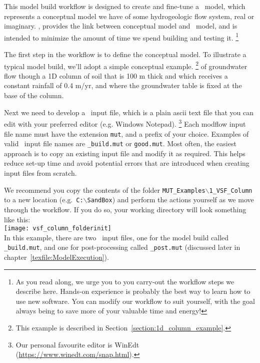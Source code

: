\label{chapter:ModelBuild}
This model build workflow
is designed to create and fine-tune a \mfus\ model, which represents a conceptual model we have of some hydrogeologic flow system, real or imaginary. \mut, provides the link between conceptual model and \mfus\ model, and is intended to minimize the amount of time we spend building and testing it.
    \footnote{As you read along, we urge you to you carry-out the workflow steps we describe here. Hands-on experience is probably the best way to learn how to use new software. You can modify our workflow to suit yourself, with the goal always being to save more of your valuable time and energy!}


The first step in the workflow is to define the conceptual model.  To illustrate a typical model build,  we'll adopt a simple conceptual example.
    \footnote{This example is described in Section~\ref{section:1d_column_example}.}
of groundwater flow though a 1D column of soil that is 100 m thick and which receives a constant rainfall of 0.4 m/yr, and where the groundwater table is fixed at the base of the column.

Next we need to develop a \mut\ input file, which is a plain ascii text file that you can edit with your preferred editor (e.g. Windows Notepad). \footnote{Our personal favourite editor is WinEdt (\url{https://www.winedt.com/snap.html}).}
Each modflow input file name must have the extension \texttt{mut}, and a prefix of your choice. Examples of valid \mut\ input file names are \texttt{\_build.mut} or \texttt{good.mut}. Most often, the easiest approach is to copy an existing input file and modify it as required.  This helps reduce set-up time and avoid potential errors that are introduced when creating input files from scratch.

We recommend you copy the contents of the folder \texttt{MUT\_Examples$\backslash$1\_VSF\_Column} to a new location (e.g.\ \texttt{C:$\backslash$SandBox}) and perform the actions yourself as we move through the workflow.  If you do so, your working directory will look something like this:
    \vspace{.2in} \\
    \texttt{[image: vsf\_column\_folderinit]}
    \vspace{.2in} \\
In this example, there are two \mut\ input files, one for the model build called \texttt{\_build.mut}, and one for post-processing called \texttt{\_post.mut} (discussed later in chapter~\ref{texfile:ModelExecution}).



